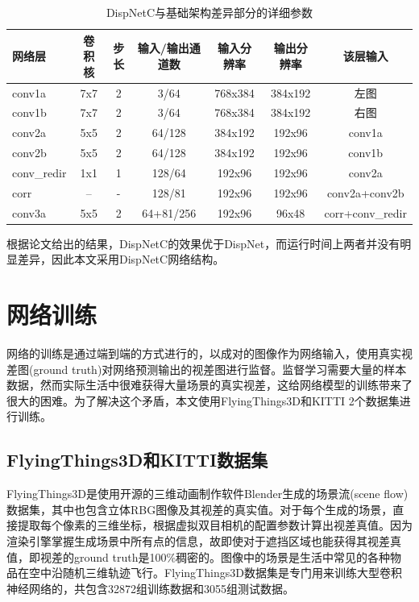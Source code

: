 \begin{table}[htbp]
	\centering
	\caption{DispNetC与基础架构差异部分的详细参数}
	\label{tab:4_1_DispNetC_architecture}
	\begin{scriptsize}
		\begin{tabular}{|l|c c c|c c|c|}\hline
			网络层  & 卷积核 & 步长 & 输入/输出通道数 & 输入分辨率 & 输出分辨率 & 该层输入 \\\hline
			conv1a             & 7x7 & 2 & 3/64                & 768x384 & 384x192 & 左图 \\
			conv1b             & 7x7 & 2 & 3/64                & 768x384 & 384x192 & 右图 \\
			conv2a             & 5x5 & 2 & 64/128           & 384x192  & 192x96    & conv1a \\
			conv2b             & 5x5 & 2 & 64/128           & 384x192  & 192x96    & conv1b \\
			conv\_redir      & 1x1 & 1 & 128/64            & 192x96    & 192x96    & conv2a \\
			corr                   & --   &  - & 128/81            & 192x96    & 192x96    & conv2a+conv2b \\
			conv3a            & 5x5 & 2 & 64+81/256    & 192x96    & 96x48      & corr+conv\_redir \\\hline
		\end{tabular}
	\end{scriptsize}
\end{table}

根据论文\cite{mayer2016large}给出的结果，DispNetC的效果优于DispNet，而运行时间上两者并没有明显差异，因此本文采用DispNetC网络结构。

\section{网络训练}
网络的训练是通过端到端的方式进行的，以成对的图像作为网络输入，使用真实视差图(ground truth)对网络预测输出的视差图进行监督。监督学习需要大量的样本数据，然而实际生活中很难获得大量场景的真实视差，这给网络模型的训练带来了很大的困难。为了解决这个矛盾，本文使用FlyingThings3D和KITTI 2个数据集进行训练。

\subsection{FlyingThings3D和KITTI数据集}
FlyingThings3D\cite{mayer2016large}是使用开源的三维动画制作软件Blender生成的场景流(scene flow)数据集，其中也包含立体RBG图像及其视差的真实值。对于每个生成的场景，直接提取每个像素的三维坐标，根据虚拟双目相机的配置参数计算出视差真值。因为渲染引擎掌握生成场景中所有点的信息，故即使对于遮挡区域也能获得其视差真值，即视差的ground truth是100\%稠密的。图像中的场景是生活中常见的各种物品在空中沿随机三维轨迹飞行。FlyingThings3D数据集是专门用来训练大型卷积神经网络的，共包含32872组训练数据和3055组测试数据。

